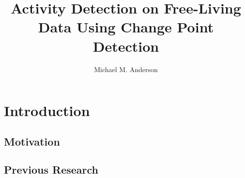 \documentclass[onehalf,11pt]{beavtex}
\title{Activity Detection on Free-Living Data Using Change Point Detection}
\author{Michael M. Anderson}
\begin{document}
\maketitle
\mainmatter

\chapter{Introduction}
\section{Motivation}
\section{Previous Research}









%
\end{document}
